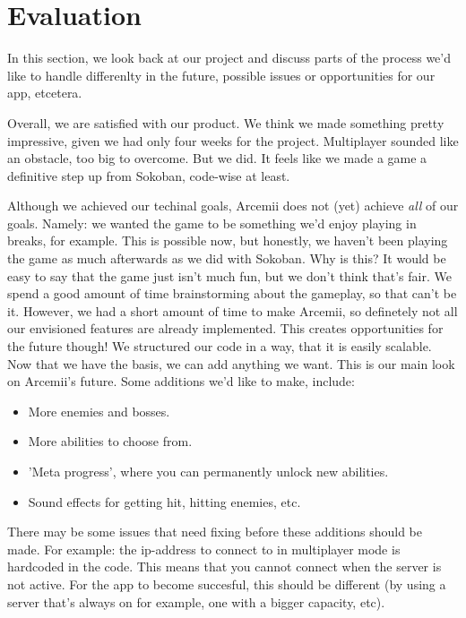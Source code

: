 \documentclass[../main.tex]{subfiles}
\begin{document}
\pagebreak
\section{Evaluation}
In this section, we look back at our project and discuss parts of the process we'd like to handle differenlty in the future, possible issues or opportunities for our app, etcetera.

\bigbreak\noindent
Overall, we are satisfied with our product. We think we made something pretty impressive, given we had only four weeks for the project. Multiplayer sounded like an obstacle, too big to overcome. But we did. It feels like we made a game a definitive step up from Sokoban, code-wise at least. 

Although we achieved our techinal goals, Arcemii does not (yet) achieve \textit{all} of our goals. Namely: we wanted the game to be something we'd enjoy playing in breaks, for example. This is possible now, but honestly, we haven't been playing the game as much afterwards as we did with Sokoban. Why is this? It would be easy to say that the game just isn't much fun, but we don't think that's fair. We spend a good amount of time brainstorming about the gameplay, so that can't be it. However, we had a short amount of time to make Arcemii, so definetely not all our envisioned features are already implemented. This creates opportunities for the future though! We structured our code in a way, that it is easily scalable. Now that we have the basis, we can add anything we want. This is our main look on Arcemii's future. Some additions we'd like to make, include:
\begin{itemize}
	\item More enemies and bosses.
	\item More abilities to choose from.
	\item 'Meta progress', where you can permanently unlock new abilities.
	\item Sound effects for getting hit, hitting enemies, etc.
\end{itemize}

There may be some issues that need fixing before these additions should be made. For example: the ip-address to connect to in multiplayer mode is hardcoded in the code. This means that you cannot connect when the server is not active. For the app to become succesful, this should be different (by using a server that's always on for example, one with a bigger capacity, etc).
\end{document}
